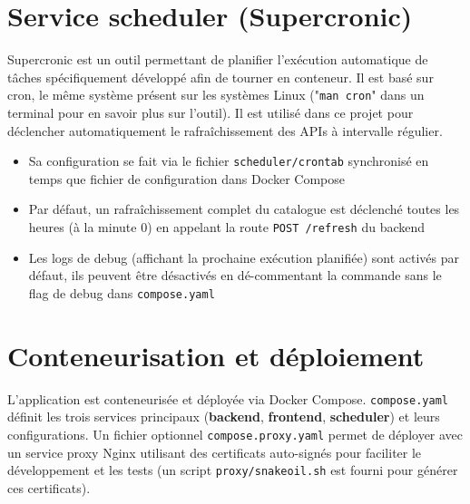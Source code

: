 \section{Service scheduler (Supercronic)}
Supercronic est un outil permettant de planifier l'exécution automatique de tâches spécifiquement développé afin de tourner en conteneur. Il est basé sur cron, le même système présent sur les systèmes Linux ("\texttt{man cron}" dans un terminal pour en savoir plus sur l'outil). Il est utilisé dans ce projet pour déclencher automatiquement le rafraîchissement des APIs à intervalle régulier.

\begin{itemize}
    \item[$\bullet$] Sa configuration se fait via le fichier \texttt{scheduler/crontab} synchronisé en temps que fichier de configuration dans Docker Compose
    \item[$\bullet$] Par défaut, un rafraîchissement complet du catalogue est déclenché toutes les heures (à la minute 0) en appelant la route \texttt{POST /refresh} du backend
    \item[$\bullet$] Les logs de debug (affichant la prochaine exécution planifiée) sont activés par défaut, ils peuvent être désactivés en dé-commentant la commande sans le flag de debug dans \texttt{compose.yaml}
\end{itemize}
\section{Conteneurisation et déploiement}\label{sec:deployment}
L'application est conteneurisée et déployée via Docker Compose. \texttt{compose.yaml} définit les trois services principaux (\textbf{backend}, \textbf{frontend}, \textbf{scheduler}) et leurs configurations. Un fichier optionnel \texttt{compose.proxy.yaml} permet de déployer avec un service proxy Nginx utilisant des certificats auto-signés pour faciliter le développement et les tests (un script \texttt{proxy/snakeoil.sh} est fourni pour générer ces certificats).

